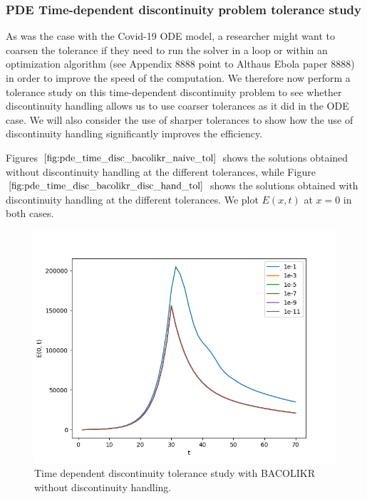 \documentclass{article}
\begin{document}
\subsubsection{PDE Time-dependent discontinuity problem tolerance study}
\label{subsubsection:pde_time_tol}

As was the case with the Covid-19 ODE model, a researcher might want to coarsen the tolerance if they need to run the solver in a loop or within an optimization algorithm (see Appendix 8888 point to Althaus Ebola paper 8888) in order to improve the speed of the computation. We therefore now perform a tolerance study on this time-dependent discontinuity problem to see whether discontinuity handling allows us to use coarser tolerances as it did in the ODE case. We will also consider the use of sharper tolerances to show how the use of discontinuity handling significantly improves the efficiency.

Figures $\ref{fig:pde_time_disc_bacolikr_naive_tol}$ shows the solutions obtained without discontinuity handling at the different tolerances, while Figure $\ref{fig:pde_time_disc_bacolikr_disc_hand_tol}$ shows the solutions obtained with discontinuity handling at the different tolerances. We plot $E(x, t)$ at $x=0$ in both cases. 

\begin{figure}[H]
\centering
\includegraphics[width=0.7\linewidth]{./figures/pde_time_disc_bacolikr_naive_tol}
\caption{Time dependent discontinuity tolerance study with BACOLIKR without discontinuity handling.}
\label{fig:pde_time_disc_bacolikr_naive_tol}
\end{figure}
\end{document}
